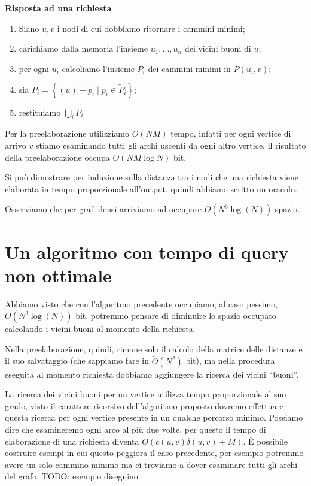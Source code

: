 \documentclass[a4paper,10pt]{amsbook}
\theoremstyle{plain}
\theoremstyle{definition}
\theoremstyle{remark}
\newcommand{\set}[1]{\left\{#1\right\}}
\newcommand{\pa}[1]{\left(#1\right)}
\begin{document}
\textbf{Risposta ad una richiesta}
\begin{enumerate}
\item Siano $u,v$ i nodi di cui dobbiamo ritornare i cammini minimi;
\item carichiamo dalla memoria l'insieme $u_1,..., u_n$ dei vicini
  buoni di $u$;
\item per ogni $u_i$ calcoliamo l'insieme $\tilde P _i$ dei cammini
  minimi in $P(u_i,v)$;
\item sia $P_i = \set{ (u) + \tilde p _i \mid \tilde p_i \in \tilde
    P_i }$;
\item restituiamo $\bigcup _i P_i$
\end{enumerate}

Per la preelaborazione utilizziamo $O\pa{ NM}$ tempo, infatti per ogni
vertice di arrivo $v$ stiamo esaminando tutti gli archi uscenti da
ogni altro vertice, il risultato della preelaborazione occupa $O\pa{
  NM \log {N}}$ bit.

Si pu\`o dimostrare per induzione sulla distanza tra i nodi che una
richiesta viene elaborata in tempo proporzionale all'output, quindi
abbiamo scritto un oracolo.

Osserviamo che per grafi densi arriviamo ad occupare $O\pa{ N^3 \log
  \pa{N}}$ spazio.

\section{Un algoritmo con tempo di query non ottimale}

Abbiamo visto che con l'algoritmo precedente occupiamo, al caso
pessimo, $O\pa{ N^3 \log\pa{N}}$ bit, potremmo pensare di
diminuire lo spazio occupato calcolando i vicini buoni al momento
della richiesta.

Nella preelaborazione, quindi, rimane solo il calcolo della matrice
delle distanze e il suo salvataggio (che sappiamo fare in $\tilde
O\pa{ N^2}$ bit), ma nella procedura eseguita al momento richiesta
dobbiamo aggiungere la ricerca dei vicini ``buoni''.

La ricerca dei vicini buoni per un vertice utilizza tempo
proporzionale al suo grado, visto il carattere ricorsivo
dell'algoritmo proposto dovremo effettuare questa ricerca per ogni
vertice presente in un qualche percorso minimo. Possiamo dire che
esamineremo ogni arco al pi\`u due volte, per questo il tempo di
elaborazione di una richiesta diventa $O\pa{ c\pa{u,v} \delta\pa{u,v}
  + M}$. \`E possibile costruire esempi in cui questo peggiora il caso
precedente, per esempio potremmo avere un solo cammino minimo ma ci
troviamo a dover esaminare tutti gli archi del grafo. TODO: esempio
disegnino
\end{document}
